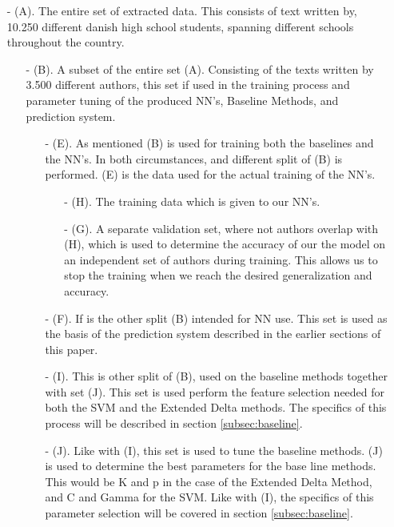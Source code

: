 \begin{itemize}

\item[- (A).] The entire set of extracted data. This consists of text written
by, 10.250 different danish high school students, spanning different schools
throughout the country.

\begin{itemize}

\item[- (B).]
A subset of the entire set (A). Consisting of the texts written by
3.500 different authors, this set if used in the training process and parameter
tuning of the produced \gls{NN}'s, Baseline Methods, and prediction system.

\begin{itemize}

\item[- (E).] As mentioned (B) is used for training both the baselines and the 
\gls{NN}'s. In both circumstances, and different split of (B) is performed.
(E) is the data used for the actual training of the \gls{NN}'s.


\begin{itemize}
\item[- (H).] The training data which is given to our \gls{NN}'s.

\item[- (G).] A separate validation set, where not authors overlap with (H), which
is used to determine the accuracy of our the model on an independent set of
authors during training. This allows us to stop the training when we reach
the desired generalization and accuracy.

\end{itemize}


\item[- (F).] If is the other split (B) intended for \gls{NN} use. This set is
used as the basis of the prediction system described in the earlier 
sections of this paper.

\item[- (I).] This is other split of (B), used on the baseline methods together
with set (J). This set is used perform the feature selection needed for both
the SVM and the Extended Delta methods. The specifics of this process will be
described in section \ref{subsec:baseline}.

\item[- (J).] Like with (I), this set is used to tune the baseline methods. (J) is
used to determine the best parameters for the base line methods. This would be K
and p in the case of the Extended Delta Method, and C and Gamma for the SVM.
Like with (I), the specifics of this parameter selection will be covered in
section \ref{subsec:baseline}.


\end{itemize}
\end{itemize}
\end{itemize}
